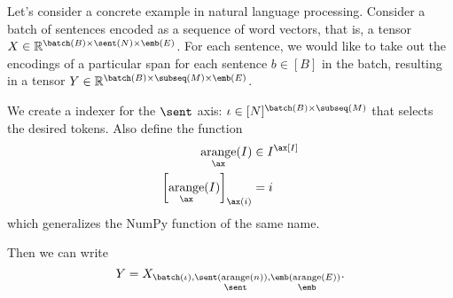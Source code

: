 Let's consider a concrete example in natural language processing. Consider a batch of sentences encoded as a sequence of word vectors, that is, a tensor $X \in \mathbb{R}^{\batch(B) \times \sent(N) \times \emb(E)}$. For each sentence, we would like to take out the encodings of a particular span for each sentence $b \in [B]$ in the batch, resulting in a tensor $Y \in \mathbb{R}^{\batch(B) \times \subseq(M) \times \emb(E)}$.

We create a indexer for the $\sent$ axis: $\iota \in [N]^{\batch(B) \times \subseq(M)}$ that selects the desired tokens. Also define the function
\begin{align*}
  \nfun{\ax}{arange}(I) &\in I^{\ax[I]} \\
  \left[\nfun{\ax}{arange}(I)\right]_{\ax(i)} &= i
\end{align*}
which generalizes the NumPy function of the same name.

Then we can write
\begin{equation*}
  Y = X_{\batch(\iota), \sent(\nfun{\sent}{arange}(n)), \emb(\nfun{\emb}{arange}(E))}.
\end{equation*}
